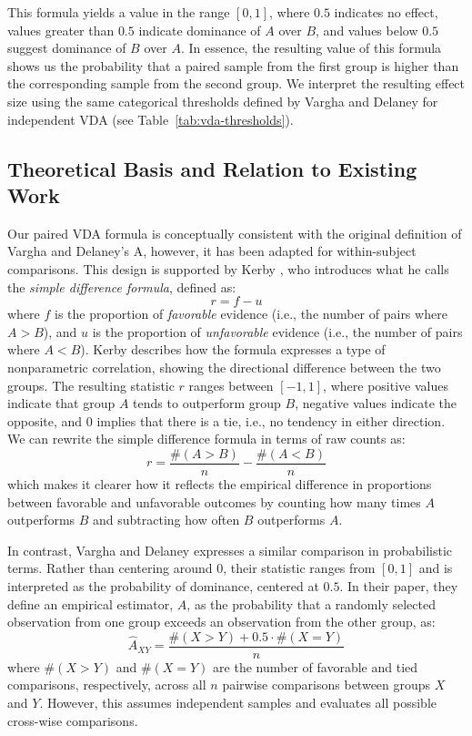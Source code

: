 \documentclass[conference]{IEEEtran}
\begin{document}
This formula yields a value in the range $[0, 1]$, where $0.5$ indicates no effect, values greater than $0.5$ indicate dominance of $A$ over $B$, and values below $0.5$ suggest dominance of $B$ over $A$. In essence, the resulting value of this formula shows us the probability that a paired sample from the first group is higher than the corresponding sample from the second group. We interpret the resulting effect size using the same categorical thresholds defined by Vargha and Delaney for independent VDA (see Table~\ref{tab:vda-thresholds}).


\subsection{Theoretical Basis and Relation to Existing Work}
Our paired VDA formula is conceptually consistent with the original definition of Vargha and Delaney's A, however, it has been adapted for within-subject comparisons. This design is supported by Kerby \cite{kerby2014simplediff}, who introduces what he calls the \textit{simple difference formula}, defined as:
\[
r=f-u
\]
where $f$ is the proportion of \textit{favorable} evidence (i.e., the number of pairs where $A > B$), and $u$ is the proportion of \textit{unfavorable} evidence (i.e., the number of pairs where $A < B$). Kerby describes how the formula expresses a type of nonparametric correlation, showing the directional difference between the two groups. The resulting statistic $r$ ranges between $[-1, 1]$, where positive values indicate that group $A$ tends to outperform group $B$, negative values indicate the opposite, and 0 implies that there is a tie, i.e., no tendency in either direction. We can rewrite the simple difference formula in terms of raw counts as:
\[
r = \frac{\#(A > B)}{n} - \frac{\#(A < B)}{n}
\]
which makes it clearer how it reflects the empirical difference in proportions between favorable and unfavorable outcomes by counting how many times $A$ outperforms $B$ and subtracting how often $B$ outperforms $A$.

In contrast, Vargha and Delaney expresses a similar comparison in probabilistic terms. Rather than centering around $0$, their statistic ranges from $[0, 1]$ and is interpreted as the probability of dominance, centered at $0.5$. In their paper, they define an empirical estimator, $A$, as the probability that a randomly selected observation from one group exceeds an observation from the other group, as: 
\[
\hat{A}_{XY} = \frac{\#(X > Y) + 0.5 \cdot \#(X = Y)}{n}
\]
where $\#(X > Y)$ and $\#(X = Y)$ are the number of favorable and tied comparisons, respectively, across all $n$ pairwise comparisons between groups $X$ and $Y$. However, this assumes independent samples and evaluates all possible cross-wise comparisons.
\end{document}
